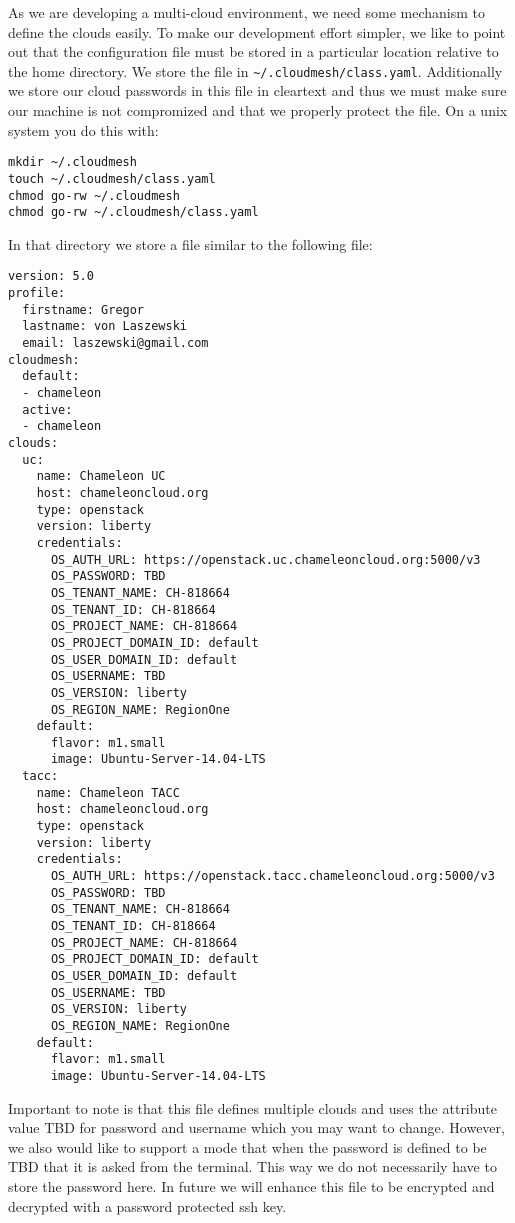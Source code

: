 As we are developing a multi-cloud environment, we need some mechanism
to define the clouds easily. To make our development effort simpler,
we like to point out that the configuration file must be stored in a
particular location relative to the home directory. We store the file
in \verb|~/.cloudmesh/class.yaml|. Additionally we store our cloud
passwords in this file in cleartext and thus we must make sure our
machine is not compromized and that we properly protect the file. On a
unix system you do this with:

\begin{verbatim}
mkdir ~/.cloudmesh
touch ~/.cloudmesh/class.yaml
chmod go-rw ~/.cloudmesh
chmod go-rw ~/.cloudmesh/class.yaml
\end{verbatim}

In that directory we store a file similar to the following file:

\begin{verbatim}
version: 5.0
profile:
  firstname: Gregor
  lastname: von Laszewski
  email: laszewski@gmail.com
cloudmesh:
  default:
  - chameleon 
  active:
  - chameleon
clouds:
  uc:
    name: Chameleon UC
    host: chameleoncloud.org
    type: openstack
    version: liberty
    credentials:
      OS_AUTH_URL: https://openstack.uc.chameleoncloud.org:5000/v3
      OS_PASSWORD: TBD
      OS_TENANT_NAME: CH-818664
      OS_TENANT_ID: CH-818664
      OS_PROJECT_NAME: CH-818664
      OS_PROJECT_DOMAIN_ID: default
      OS_USER_DOMAIN_ID: default
      OS_USERNAME: TBD
      OS_VERSION: liberty
      OS_REGION_NAME: RegionOne
    default:
      flavor: m1.small
      image: Ubuntu-Server-14.04-LTS
  tacc:
    name: Chameleon TACC
    host: chameleoncloud.org
    type: openstack
    version: liberty
    credentials:
      OS_AUTH_URL: https://openstack.tacc.chameleoncloud.org:5000/v3
      OS_PASSWORD: TBD
      OS_TENANT_NAME: CH-818664
      OS_TENANT_ID: CH-818664
      OS_PROJECT_NAME: CH-818664
      OS_PROJECT_DOMAIN_ID: default
      OS_USER_DOMAIN_ID: default
      OS_USERNAME: TBD
      OS_VERSION: liberty
      OS_REGION_NAME: RegionOne
    default:
      flavor: m1.small
      image: Ubuntu-Server-14.04-LTS
\end{verbatim}

Important to note is that this file defines multiple clouds and uses
the attribute value TBD for password and username which you may want
to change. However, we also would like to support a mode that when the
password is defined to be TBD that it is asked from the terminal. This
way we do not necessarily have to store the password here. In future
we will enhance this file to be encrypted and decrypted with a
password protected ssh key.

